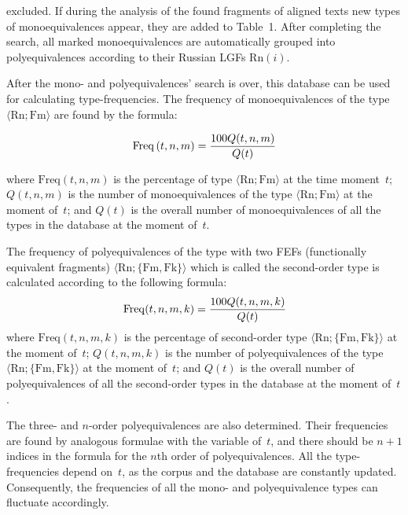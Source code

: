 \begin{multicols}{2}

\noindent
 excluded. If during the analysis of the found fragments of aligned texts new types of 
monoequivalences appear, they are added to Table~1. After completing
 the search, all marked 
monoequivalences are automatically grouped into polyequivalences according to their Russian 
LGFs $\mathrm{Rn}(i)$.

   
   After the mono- and polyequivalences' search is over, this database can be used for calculating 
type-frequencies. The frequency of monoequivalences of the type $\langle \mathrm{Rn}; \mathrm{Fm}\rangle$ are 
found by the formula:

\vspace*{2pt}

\noindent
$$
\mathrm{Freq}\left(t, n, m\right) = \displaystyle\frac{\displaystyle 100 Q(t, n, m)\mathstrut}{\displaystyle Q(t)\mathstrut}
$$

\vspace*{-2pt}

\noindent
where $\mathrm{Freq}(t, n, m)$ is the percentage of type 
$\langle \mathrm{Rn}; \mathrm{Fm}\rangle$ 
 at the time moment~$t$; $Q(t, n,  m)$ is the number of monoequivalences of the type 
 $\langle \mathrm{Rn}; \mathrm{Fm}\rangle$ 
at the moment of~$t$; and $Q(t)$ is 
the overall number of monoequivalences of all the types in 
the database at the moment of~$t$.
   
   The frequency of polyequivalences of the type with two FEFs (functionally equivalent fragments)
$\langle \mathrm{Rn}; \{\mathrm{Fm}, \mathrm{Fk}\}\rangle$ which is 
called the second-order type is calculated according to the following formula: 
$$
\mathrm{Freq}(t, n, m, k) = \displaystyle\frac{\displaystyle 100 Q(t, n, m, k)\mathstrut}{\displaystyle Q(t)\mathstrut}
$$
where $\mathrm{Freq}(t, n, m, k)$ is the percentage of second-order type 
$\langle \mathrm{Rn}; \{\mathrm{Fm}, \mathrm{Fk}\}\rangle$ at 
the moment of~$t$; $Q(t, n, m, k)$ is the number of polyequivalences of the type $\langle \mathrm{Rn}; 
\{\mathrm{Fm}, \mathrm{Fk}\}\rangle$ at the moment of~$t$; and $Q(t)$ is the overall number of polyequivalences of all 
the second-order types in the database at the moment of~$t$.

   The three- and $n$-order polyequivalences are also determined. Their frequencies are found by 
analogous formulae with the variable of~$t$, and there should be $n+1$ indices in the formula for 
the $n$th order of polyequivalences. All the type-frequencies depend on~$t$, as the corpus and the 
database are constantly updated. Consequently, the frequencies of all the mono- and polyequivalence 
types can fluctuate accordingly.
   

\end{multicols}
